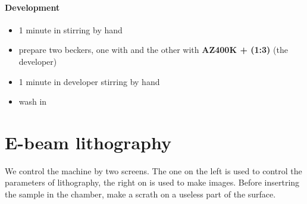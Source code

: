 \documentclass[a4paper]{article}
\begin{document}
\paragraph{Development}
\begin{itemize}
  \item 1 minute in  stirring by hand
  \item prepare two beckers, one with  and the other with \textbf{AZ400K +  (1:3)} (the developer)
  \item 1 minute in developer stirring by hand
  \item wash in 
\end{itemize}
\newpage
\section{ E-beam lithography}
We control the machine by two screens. The one on the left is used to control the parameters of lithography, the right on is used to make images. Before insertring the sample in the chamber, make a scrath on a useless part of the surface.
\end{document}
